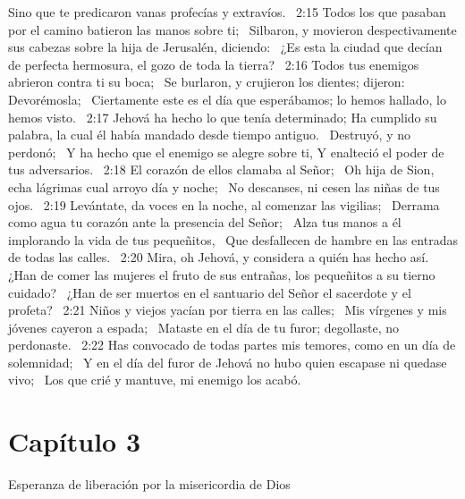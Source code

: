Sino que te predicaron vanas profecías y extravíos.  
2:15 Todos los que pasaban por el camino batieron las manos sobre ti;  
Silbaron, y movieron despectivamente sus cabezas sobre la hija de Jerusalén, diciendo:  
¿Es esta la ciudad que decían de perfecta hermosura, el gozo de toda la tierra?  
2:16 Todos tus enemigos abrieron contra ti su boca;  
Se burlaron, y crujieron los dientes; dijeron: Devorémosla;  
Ciertamente este es el día que esperábamos; lo hemos hallado, lo hemos visto.  
2:17 Jehová ha hecho lo que tenía determinado; 
Ha cumplido su palabra, la cual él había mandado desde tiempo antiguo.  
Destruyó, y no perdonó;  
Y ha hecho que el enemigo se alegre sobre ti, 
Y enalteció el poder de tus adversarios.  
2:18 El corazón de ellos clamaba al Señor;  
Oh hija de Sion, echa lágrimas cual arroyo día y noche;  
No descanses, ni cesen las niñas de tus ojos.  
2:19 Levántate, da voces en la noche, al comenzar las vigilias;  
Derrama como agua tu corazón ante la presencia del Señor;  
Alza tus manos a él implorando la vida de tus pequeñitos,  
Que desfallecen de hambre en las entradas de todas las calles.  
2:20 Mira, oh Jehová, y considera a quién has hecho así.  
¿Han de comer las mujeres el fruto de sus entrañas, los pequeñitos a su tierno cuidado?  
¿Han de ser muertos en el santuario del Señor el sacerdote y el profeta?  
2:21 Niños y viejos yacían por tierra en las calles;  
Mis vírgenes y mis jóvenes cayeron a espada;  
Mataste en el día de tu furor; degollaste, no perdonaste.  
2:22 Has convocado de todas partes mis temores, como en un día de solemnidad;  
Y en el día del furor de Jehová no hubo quien escapase ni quedase vivo;  
Los que crié y mantuve, mi enemigo los acabó.  
\section*{Capítulo 3}
Esperanza de liberación por la misericordia de Dios 

